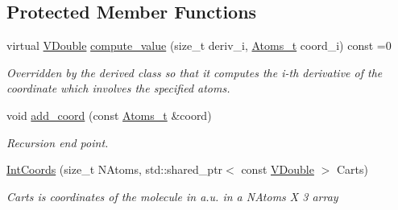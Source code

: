 \subsection*{Protected Member Functions}
\begin{DoxyCompactItemize}
\item 
virtual \hyperlink{classFManII_1_1IntCoords_af42df2795dec16350f908cfd5ac2ef06}{V\+Double} \hyperlink{classFManII_1_1IntCoords_ae8d77a3410edbc99357a2289feeec510}{compute\+\_\+value} (size\+\_\+t deriv\+\_\+i, \hyperlink{classFManII_1_1IntCoords_a59ab25571f774fca97644a2ce5ade359}{Atoms\+\_\+t} coord\+\_\+i) const =0
\begin{DoxyCompactList}\small\item\em Overridden by the derived class so that it computes the i-\/th derivative of the coordinate which involves the specified atoms. \end{DoxyCompactList}\item 
void \hyperlink{classFManII_1_1IntCoords_a21ae6c2eb4a0dbea71a402f399061d5b}{add\+\_\+coord} (const \hyperlink{classFManII_1_1IntCoords_a59ab25571f774fca97644a2ce5ade359}{Atoms\+\_\+t} \&coord)\hypertarget{classFManII_1_1IntCoords_a21ae6c2eb4a0dbea71a402f399061d5b}{}\label{classFManII_1_1IntCoords_a21ae6c2eb4a0dbea71a402f399061d5b}

\begin{DoxyCompactList}\small\item\em Recursion end point. \end{DoxyCompactList}\item 
\hyperlink{classFManII_1_1IntCoords_aff5b80e7f579dd8aeac5200942b4db87}{Int\+Coords} (size\+\_\+t N\+Atoms, std\+::shared\+\_\+ptr$<$ const \hyperlink{classFManII_1_1IntCoords_af42df2795dec16350f908cfd5ac2ef06}{V\+Double} $>$ Carts)\hypertarget{classFManII_1_1IntCoords_aff5b80e7f579dd8aeac5200942b4db87}{}\label{classFManII_1_1IntCoords_aff5b80e7f579dd8aeac5200942b4db87}

\begin{DoxyCompactList}\small\item\em {\ttfamily Carts} is coordinates of the molecule in a.\+u. in a N\+Atoms X 3 array \end{DoxyCompactList}\end{DoxyCompactItemize}
